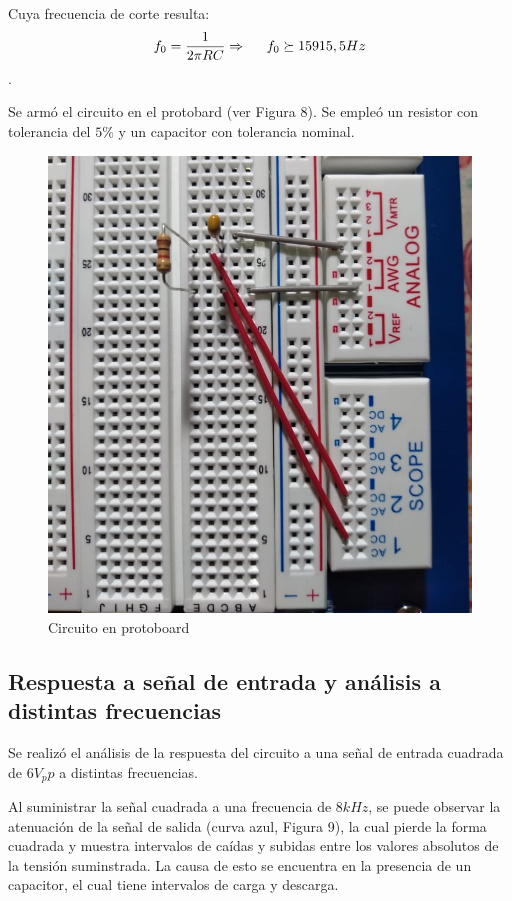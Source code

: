 Cuya frecuencia de corte resulta: $$f_0 = \frac{1}{2\pi RC} \Rightarrow \hspace{0.5cm} f_0 \succeq 15915,5 Hz$$.

Se armó el circuito en el protobard (ver Figura 8). Se empleó un resistor con tolerancia del $5\%$ y un capacitor con tolerancia nominal.

\begin{figure}[H]
	\centering
	\includegraphics[scale=0.5]{../Informe/Imagenes/RCProto.jpeg}
	\caption{Circuito en protoboard}
	\label{ej1cir}
\end{figure}


\subsection{Respuesta a señal de entrada y análisis a distintas frecuencias}

Se realizó el análisis de la respuesta del circuito a una señal de entrada cuadrada de $6V_pp$ a distintas frecuencias.

Al suministrar la señal cuadrada a una frecuencia de $8kHz$, se puede observar la atenuación de la señal de salida (curva azul, Figura 9), la cual pierde la forma cuadrada y muestra intervalos de caídas y subidas entre los valores absolutos de la tensión suminstrada. La causa de esto se encuentra en la presencia de un capacitor, el cual tiene intervalos de carga y descarga. 


